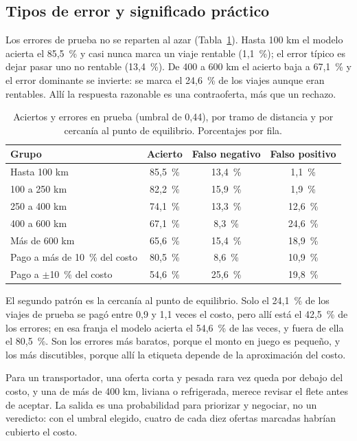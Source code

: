 \documentclass[11pt,letterpaper]{article}
\begin{document}
\subsection{Tipos de error y significado práctico}

Los errores de prueba no se reparten al azar (Tabla~\ref{tab:errores}). Hasta 100 km el modelo acierta el 85,5~\% y casi nunca marca un viaje rentable (1,1~\%); el error típico es dejar pasar uno no rentable (13,4~\%). De 400 a 600 km el acierto baja a 67,1~\% y el error dominante se invierte: se marca el 24,6~\% de los viajes aunque eran rentables. Allí la respuesta razonable es una contraoferta, más que un rechazo.

\begin{table}[H]
\centering
\small
\caption{Aciertos y errores en prueba (umbral de 0,44), por tramo de distancia y por cercanía al punto de equilibrio. Porcentajes por fila.}
\label{tab:errores}
\begin{tabular}{lccc}
\toprule
Grupo & Acierto & Falso negativo & Falso positivo \\
\midrule
Hasta 100 km & 85,5~\% & 13,4~\% & 1,1~\% \\
100 a 250 km & 82,2~\% & 15,9~\% & 1,9~\% \\
250 a 400 km & 74,1~\% & 13,3~\% & 12,6~\% \\
400 a 600 km & 67,1~\% & 8,3~\% & 24,6~\% \\
Más de 600 km & 65,6~\% & 15,4~\% & 18,9~\% \\
\midrule
Pago a más de 10~\% del costo & 80,5~\% & 8,6~\% & 10,9~\% \\
Pago a $\pm$10~\% del costo & 54,6~\% & 25,6~\% & 19,8~\% \\
\bottomrule
\end{tabular}
\end{table}

El segundo patrón es la cercanía al punto de equilibrio. Solo el 24,1~\% de los viajes de prueba se pagó entre 0,9 y 1,1 veces el costo, pero allí está el 42,5~\% de los errores; en esa franja el modelo acierta el 54,6~\% de las veces, y fuera de ella el 80,5~\%. Son los errores más baratos, porque el monto en juego es pequeño, y los más discutibles, porque allí la etiqueta depende de la aproximación del costo.

Para un transportador, una oferta corta y pesada rara vez queda por debajo del costo, y una de más de 400 km, liviana o refrigerada, merece revisar el flete antes de aceptar. La salida es una probabilidad para priorizar y negociar, no un veredicto: con el umbral elegido, cuatro de cada diez ofertas marcadas habrían cubierto el costo.
\end{document}
